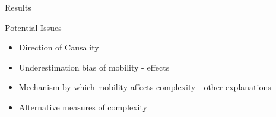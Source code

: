 \documentclass{beamer}
\begin{document}
\begin{frame}{Results}{}

\end{frame}

\begin{frame}{Potential Issues}{}
\begin{itemize}
\item{Direction of Causality}
\item{Underestimation bias of mobility - effects}
\item{Mechanism by which mobility affects complexity - other explanations}
\item{Alternative measures of complexity }
\end{itemize}
\end{frame}





\end{document}
